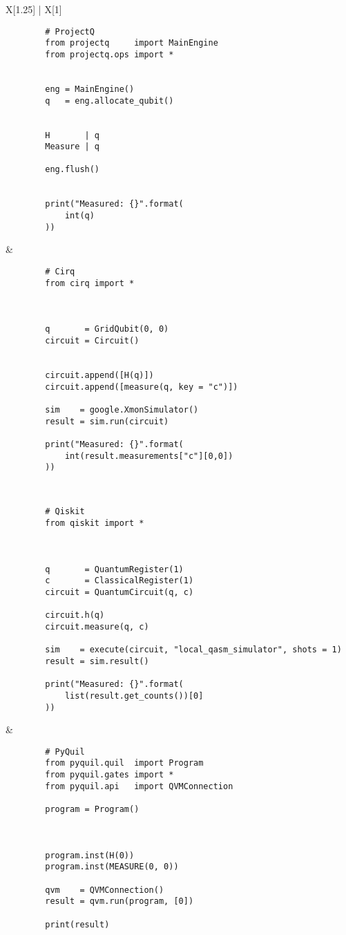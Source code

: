 \documentclass[a4paper, landscape]{article}
\begin{document}
\begin{tabu*}{ X[1.25] | X[1] }
	\begin{verbatim}
		# ProjectQ
		from projectq     import MainEngine
		from projectq.ops import *


		eng = MainEngine()
		q   = eng.allocate_qubit()


		H       | q
		Measure | q

		eng.flush()


		print("Measured: {}".format(
		    int(q)
		))
	\end{verbatim}
	&
	\begin{verbatim}
		# Cirq
		from cirq import *



		q       = GridQubit(0, 0)
		circuit = Circuit()


		circuit.append([H(q)])
		circuit.append([measure(q, key = "c")])

		sim    = google.XmonSimulator()
		result = sim.run(circuit)

		print("Measured: {}".format(
		    int(result.measurements["c"][0,0])
		))
	\end{verbatim}
	\\ \hline
	\begin{verbatim}
		# Qiskit
		from qiskit import *



		q       = QuantumRegister(1)
		c       = ClassicalRegister(1)
		circuit = QuantumCircuit(q, c)

		circuit.h(q)
		circuit.measure(q, c)

		sim    = execute(circuit, "local_qasm_simulator", shots = 1)
		result = sim.result()

		print("Measured: {}".format(
		    list(result.get_counts())[0]
		))
	\end{verbatim}
	&
	\begin{verbatim}
		# PyQuil
		from pyquil.quil  import Program
		from pyquil.gates import *
		from pyquil.api   import QVMConnection

		program = Program()



		program.inst(H(0))
		program.inst(MEASURE(0, 0))

		qvm    = QVMConnection()
		result = qvm.run(program, [0])

		print(result)
	\end{verbatim}
	\\
\end{tabu*}

\newpage
\end{document}
